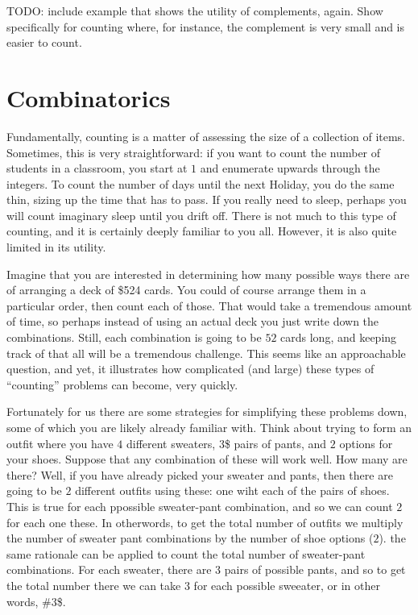 \documentclass[
  letterpaper,
  DIV=11,
  numbers=noendperiod]{scrreprt}
\begin{document}
TODO: include example that shows the utility of complements, again. Show
specifically for counting where, for instance, the complement is very
small and is easier to count.

\section{Combinatorics}\label{combinatorics}

Fundamentally, counting is a matter of assessing the size of a
collection of items. Sometimes, this is very straightforward: if you
want to count the number of students in a classroom, you start at \(1\)
and enumerate upwards through the integers. To count the number of days
until the next Holiday, you do the same thin, sizing up the time that
has to pass. If you really need to sleep, perhaps you will count
imaginary sleep until you drift off. There is not much to this type of
counting, and it is certainly deeply familiar to you all. However, it is
also quite limited in its utility.

Imagine that you are interested in determining how many possible ways
there are of arranging a deck of \$524 cards. You could of course
arrange them in a particular order, then count each of those. That would
take a tremendous amount of time, so perhaps instead of using an actual
deck you just write down the combinations. Still, each combination is
going to be \(52\) cards long, and keeping track of that all will be a
tremendous challenge. This seems like an approachable question, and yet,
it illustrates how complicated (and large) these types of ``counting''
problems can become, very quickly.

Fortunately for us there are some strategies for simplifying these
problems down, some of which you are likely already familiar with. Think
about trying to form an outfit where you have \(4\) different sweaters,
\(3\)\$ pairs of pants, and \(2\) options for your shoes. Suppose that
any combination of these will work well. How many are there? Well, if
you have already picked your sweater and pants, then there are going to
be \(2\) different outfits using these: one wiht each of the pairs of
shoes. This is true for each ppossible sweater-pant combination, and so
we can count \(2\) for each one these. In otherwords, to get the total
number of outfits we multiply the number of sweater pant combinations by
the number of shoe options (\(2\)). the same rationale can be applied to
count the total number of sweater-pant combinations. For each sweater,
there are \(3\) pairs of possible pants, and so to get the total number
there we can take \(3\) for each possible sweeater, or in other words,
\#3\$.
\end{document}

